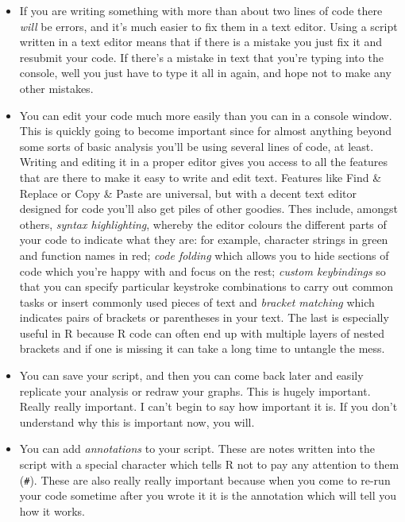 \documentclass[
]{book}
\providecommand{\tightlist}{%
  \setlength{\itemsep}{0pt}\setlength{\parskip}{0pt}}
\begin{document}
\begin{itemize}
\tightlist
\item
  If you are writing something with more than about two lines of code there \emph{will} be errors, and it's much easier to fix them in a text editor. Using a script written in a text editor means that if there is a mistake you just fix it and resubmit your code. If there's a mistake in text that you're typing into the console, well you just have to type it all in again, and hope not to make any other mistakes.
\item
  You can edit your code much more easily than you can in a console window. This is quickly going to become important since for almost anything beyond some sorts of basic analysis you'll be using several lines of code, at least. Writing and editing it in a proper editor gives you access to all the features that are there to make it easy to write and edit text. Features like Find \& Replace or Copy \& Paste are universal, but with a decent text editor designed for code you'll also get piles of other goodies. Thes include, amongst others, \emph{syntax highlighting}, whereby the editor colours the different parts of your code to indicate what they are: for example, character strings in green and function names in red; \emph{code folding} which allows you to hide sections of code which you're happy with and focus on the rest; \emph{custom keybindings} so that you can specify particular keystroke combinations to carry out common tasks or insert commonly used pieces of text and \emph{bracket matching} which indicates pairs of brackets or parentheses in your text. The last is especially useful in R because R code can often end up with multiple layers of nested brackets and if one is missing it can take a long time to untangle the mess.
\item
  You can save your script, and then you can come back later and easily replicate your analysis or redraw your graphs. This is hugely important. Really really important. I can't begin to say how important it is. If you don't understand why this is important now, you will.
\item
  You can add \emph{annotations} to your script. These are notes written into the script with a special character which tells R not to pay any attention to them (\texttt{\#}). These are also really really important because when you come to re-run your code sometime after you wrote it it is the annotation which will tell you how it works.
\end{itemize}
\end{document}
